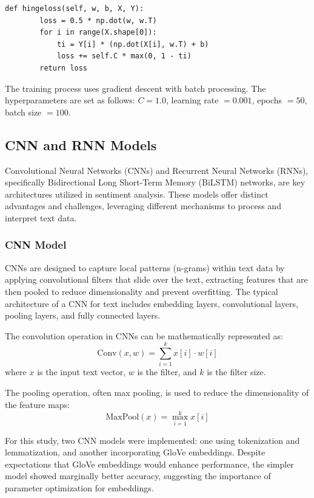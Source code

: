 \documentclass[12pt]{article}
\begin{document}
\begin{verbatim}
def hingeloss(self, w, b, X, Y):
        loss = 0.5 * np.dot(w, w.T)
        for i in range(X.shape[0]):
            ti = Y[i] * (np.dot(X[i], w.T) + b)
            loss += self.C * max(0, 1 - ti)
        return loss
\end{verbatim}

The training process uses gradient descent with batch processing. The hyperparameters are set as follows: $C=1.0$, learning rate $=0.001$, epochs $=50$, batch size $=100$.

\subsection{CNN and RNN Models}
Convolutional Neural Networks (CNNs) and Recurrent Neural Networks (RNNs), specifically Bidirectional Long Short-Term Memory (BiLSTM) networks, are key architectures utilized in sentiment analysis. These models offer distinct advantages and challenges, leveraging different mechanisms to process and interpret text data.

\subsubsection{CNN Model}
CNNs are designed to capture local patterns (n-grams) within text data by applying convolutional filters that slide over the text, extracting features that are then pooled to reduce dimensionality and prevent overfitting. The typical architecture of a CNN for text includes embedding layers, convolutional layers, pooling layers, and fully connected layers.

The convolution operation in CNNs can be mathematically represented as:
\begin{equation}
\text{Conv}(x, w) = \sum_{i=1}^{k} x[i] \cdot w[i]
\end{equation}
where \( x \) is the input text vector, \( w \) is the filter, and \( k \) is the filter size.

The pooling operation, often max pooling, is used to reduce the dimensionality of the feature maps:
\begin{equation}
\text{MaxPool}(x) = \max_{i=1}^{k} x[i]
\end{equation}

For this study, two CNN models were implemented: one using tokenization and lemmatization, and another incorporating GloVe embeddings. Despite expectations that GloVe embeddings would enhance performance, the simpler model showed marginally better accuracy, suggesting the importance of parameter optimization for embeddings.
\end{document}
